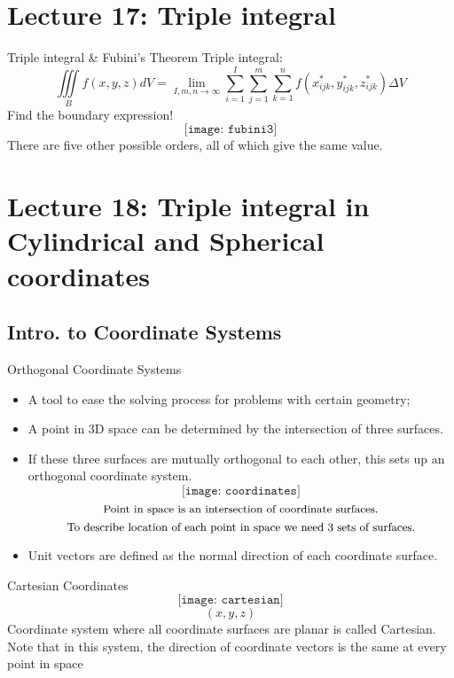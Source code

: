 \documentclass[10pt]{beamer}
\begin{document}
\section{Lecture 17: Triple integral}

\begin{frame}[allowframebreaks]{Triple integral \& Fubini's Theorem}
	Triple integral:
	$$\iiint\limits_Bf(x,y,z)dV = \lim\limits_{I,m,n\rightarrow\infty}\sum_{i = 1}^{I}\sum_{j = 1}^{m}\sum_{k = 1}^{n}f(x_{ijk}^*,y_{ijk}^*,z_{ijk}^*)\Delta V$$
	\centering
	Find the boundary expression!
	$$$$
	$$\texttt{[image: fubini3]}$$
\centering
There are five other possible orders, all of which give the same value.
\end{frame}








\section{Lecture 18: Triple integral in Cylindrical and Spherical coordinates}

\subsection{Intro. to Coordinate Systems}
\begin{frame}[allowframebreaks]{Orthogonal Coordinate Systems}
	\begin{itemize}
		\item A tool to ease the solving process for problems
		with certain geometry;
		\item {\color{blue}A point in 3D space can be determined by the
		intersection of three surfaces.}
	\item If these three surfaces are {\color{red}mutually orthogonal} to
	each other, this sets up an orthogonal coordinate
	system.
	$$\texttt{[image: coordinates]}$$
	$$\text{\small Point in space is an
		intersection of
		coordinate surfaces.}$$$$\text{\small To describe location of each
		point in space we need 3
		sets of surfaces.}$$
	\item {\color{red} Unit vectors} are defined as the normal direction of each
	coordinate surface.
	\end{itemize}
\end{frame}


\begin{frame}[allowframebreaks]{Cartesian Coordinates}
$$\texttt{[image: cartesian]}$$
$$(x,y,z)$$
Coordinate system where all coordinate surfaces are planar is
called {\color{red}Cartesian}. Note that in this system, the direction of
coordinate vectors is the same at every point in space
\end{frame}
\end{document}
